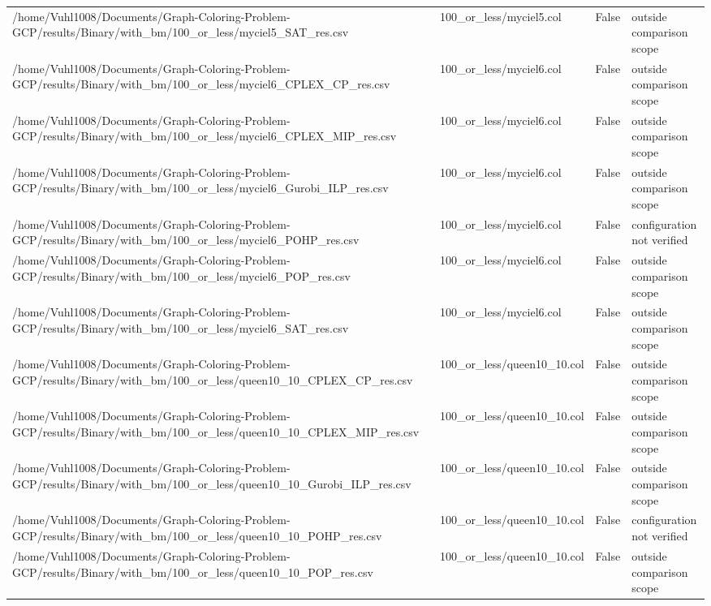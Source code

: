 \begin{table}[htbp]
\begin{tabular}{llll}
/home/Vuhl1008/Documents/Graph-Coloring-Problem-GCP/results/Binary/with\_bm/100\_or\_less/myciel5\_SAT\_res.csv & 100\_or\_less/myciel5.col & False & outside comparison scope \\
/home/Vuhl1008/Documents/Graph-Coloring-Problem-GCP/results/Binary/with\_bm/100\_or\_less/myciel6\_CPLEX\_CP\_res.csv & 100\_or\_less/myciel6.col & False & outside comparison scope \\
/home/Vuhl1008/Documents/Graph-Coloring-Problem-GCP/results/Binary/with\_bm/100\_or\_less/myciel6\_CPLEX\_MIP\_res.csv & 100\_or\_less/myciel6.col & False & outside comparison scope \\
/home/Vuhl1008/Documents/Graph-Coloring-Problem-GCP/results/Binary/with\_bm/100\_or\_less/myciel6\_Gurobi\_ILP\_res.csv & 100\_or\_less/myciel6.col & False & outside comparison scope \\
/home/Vuhl1008/Documents/Graph-Coloring-Problem-GCP/results/Binary/with\_bm/100\_or\_less/myciel6\_POHP\_res.csv & 100\_or\_less/myciel6.col & False & configuration not verified \\
/home/Vuhl1008/Documents/Graph-Coloring-Problem-GCP/results/Binary/with\_bm/100\_or\_less/myciel6\_POP\_res.csv & 100\_or\_less/myciel6.col & False & outside comparison scope \\
/home/Vuhl1008/Documents/Graph-Coloring-Problem-GCP/results/Binary/with\_bm/100\_or\_less/myciel6\_SAT\_res.csv & 100\_or\_less/myciel6.col & False & outside comparison scope \\
/home/Vuhl1008/Documents/Graph-Coloring-Problem-GCP/results/Binary/with\_bm/100\_or\_less/queen10\_10\_CPLEX\_CP\_res.csv & 100\_or\_less/queen10\_10.col & False & outside comparison scope \\
/home/Vuhl1008/Documents/Graph-Coloring-Problem-GCP/results/Binary/with\_bm/100\_or\_less/queen10\_10\_CPLEX\_MIP\_res.csv & 100\_or\_less/queen10\_10.col & False & outside comparison scope \\
/home/Vuhl1008/Documents/Graph-Coloring-Problem-GCP/results/Binary/with\_bm/100\_or\_less/queen10\_10\_Gurobi\_ILP\_res.csv & 100\_or\_less/queen10\_10.col & False & outside comparison scope \\
/home/Vuhl1008/Documents/Graph-Coloring-Problem-GCP/results/Binary/with\_bm/100\_or\_less/queen10\_10\_POHP\_res.csv & 100\_or\_less/queen10\_10.col & False & configuration not verified \\
/home/Vuhl1008/Documents/Graph-Coloring-Problem-GCP/results/Binary/with\_bm/100\_or\_less/queen10\_10\_POP\_res.csv & 100\_or\_less/queen10\_10.col & False & outside comparison scope \\

\end{tabular}
\end{table}

